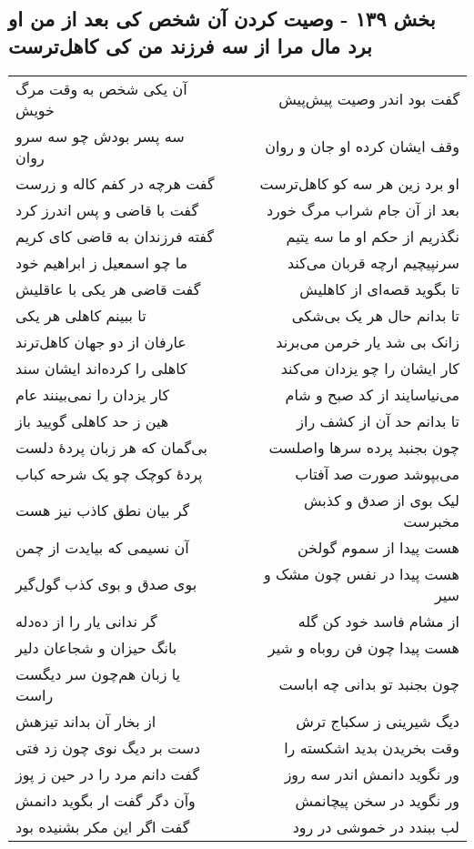 \begin{center}
\section*{بخش ۱۳۹ - وصیت کردن آن شخص کی بعد از من او برد مال مرا از سه فرزند من کی کاهل‌ترست}
\label{sec:sh139}
\begin{longtable}{l p{0.5cm} r}
آن یکی شخص به وقت مرگ خویش
&&
گفت بود اندر وصیت پیش‌پیش
\\
سه پسر بودش چو سه سرو روان
&&
وقف ایشان کرده او جان و روان
\\
گفت هرچه در کفم کاله و زرست
&&
او برد زین هر سه کو کاهل‌ترست
\\
گفت با قاضی و پس اندرز کرد
&&
بعد از آن جام شراب مرگ خورد
\\
گفته فرزندان به قاضی کای کریم
&&
نگذریم از حکم او ما سه یتیم
\\
ما چو اسمعیل ز ابراهیم خود
&&
سرنپیچیم ارچه قربان می‌کند
\\
گفت قاضی هر یکی با عاقلیش
&&
تا بگوید قصه‌ای از کاهلیش
\\
تا ببینم کاهلی هر یکی
&&
تا بدانم حال هر یک بی‌شکی
\\
عارفان از دو جهان کاهل‌ترند
&&
زانک بی شد یار خرمن می‌برند
\\
کاهلی را کرده‌اند ایشان سند
&&
کار ایشان را چو یزدان می‌کند
\\
کار یزدان را نمی‌بینند عام
&&
می‌نیاسایند از کد صبح و شام
\\
هین ز حد کاهلی گویید باز
&&
تا بدانم حد آن از کشف راز
\\
بی‌گمان که هر زبان پردهٔ دلست
&&
چون بجنبد پرده سرها واصلست
\\
پردهٔ کوچک چو یک شرحه کباب
&&
می‌بپوشد صورت صد آفتاب
\\
گر بیان نطق کاذب نیز هست
&&
لیک بوی از صدق و کذبش مخبرست
\\
آن نسیمی که بیایدت از چمن
&&
هست پیدا از سموم گولخن
\\
بوی صدق و بوی کذب گول‌گیر
&&
هست پیدا در نفس چون مشک و سیر
\\
گر ندانی یار را از ده‌دله
&&
از مشام فاسد خود کن گله
\\
بانگ حیزان و شجاعان دلیر
&&
هست پیدا چون فن روباه و شیر
\\
یا زبان هم‌چون سر دیگست راست
&&
چون بجنبد تو بدانی چه اباست
\\
از بخار آن بداند تیزهش
&&
دیگ شیرینی ز سکباج ترش
\\
دست بر دیگ نوی چون زد فتی
&&
وقت بخریدن بدید اشکسته را
\\
گفت دانم مرد را در حین ز پوز
&&
ور نگوید دانمش اندر سه روز
\\
وآن دگر گفت ار بگوید دانمش
&&
ور نگوید در سخن پیچانمش
\\
گفت اگر این مکر بشنیده بود
&&
لب ببندد در خموشی در رود
\\
\end{longtable}
\end{center}
